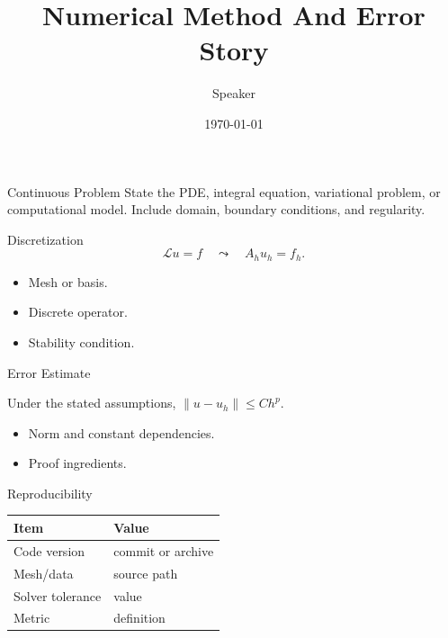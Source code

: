 \documentclass[10pt,aspectratio=169]{beamer}
\title{Numerical Method And Error Story}
\author{Speaker}
\date{\today}
\begin{document}
\begin{frame}\titlepage\end{frame}
\begin{frame}{Continuous Problem}
  State the PDE, integral equation, variational problem, or computational model.
  Include domain, boundary conditions, and regularity.
\end{frame}

\begin{frame}{Discretization}
  \[
    \mathcal{L}u=f
    \quad\leadsto\quad
    A_h u_h = f_h .
  \]
  \begin{itemize}
    \item Mesh or basis.
    \item Discrete operator.
    \item Stability condition.
  \end{itemize}
\end{frame}

\begin{frame}{Error Estimate}
  \begin{theorem}
    Under the stated assumptions, \(\|u-u_h\| \le C h^p\).
  \end{theorem}
  \begin{itemize}
    \item Norm and constant dependencies.
    \item Proof ingredients.
  \end{itemize}
\end{frame}

\begin{frame}{Reproducibility}
  \begin{tabular}{ll}
    \toprule
    Item & Value \\
    \midrule
    Code version & commit or archive \\
    Mesh/data & source path \\
    Solver tolerance & value \\
    Metric & definition \\
    \bottomrule
  \end{tabular}
\end{frame}
\end{document}
